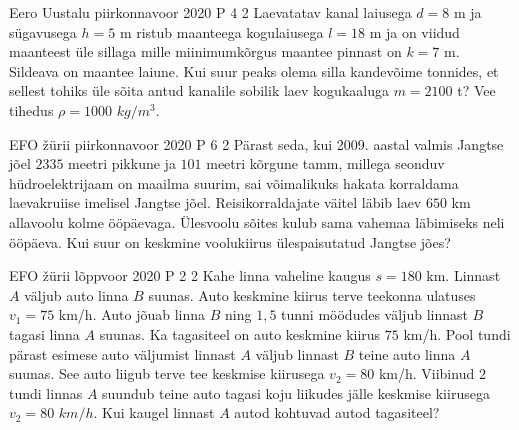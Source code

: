 \documentclass[11pt]{article}
\begin{document}
{%
{Eero Uustalu} %
{piirkonnavoor} %
{2020} %
{P 4} %
{2} %
{
\ifStatement
Laevatatav kanal laiusega $d = 8$ m ja sügavusega $h = 5$ m ristub maanteega kogulaiusega $l = 18$ m ja on viidud maanteest üle sillaga mille miinimumkõrgus maantee pinnast on $k = 7$ m. Sildeava on maantee laiune. Kui suur peaks olema silla kandevõime tonnides, et sellest tohiks üle sõita antud kanalile sobilik laev kogukaaluga $m = 2100$ t? Vee tihedus $\rho = 1000$ $kg/m^3$.
\fi
}

{EFO žürii} %
{piirkonnavoor} %
{2020} %
{P 6} %
{2} %
{
\ifStatement
Pärast seda, kui 2009. aastal valmis Jangtse jõel $2335$ meetri pikkune ja $101$ meetri kõrgune tamm, millega seonduv hüdroelektrijaam on maailma suurim, sai võimalikuks hakata korraldama laevakruiise imelisel Jangtse jõel. Reisikorraldajate väitel läbib laev $650$ km allavoolu kolme ööpäevaga. Ülesvoolu sõites kulub sama vahemaa läbimiseks neli ööpäeva. Kui suur on keskmine voolukiirus ülespaisutatud Jangtse jões?
\fi
}

{EFO žürii} %
{lõppvoor} %
{2020} %
{P 2} %
{2} %
{
\ifStatement
Kahe linna vaheline kaugus $s = 180$ km. Linnast $A$ väljub auto linna $B$ suunas. Auto keskmine kiirus terve teekonna ulatuses $v_1 = 75$ km/h. Auto jõuab linna $B$ ning $1,5$ tunni möödudes väljub linnast $B$ tagasi linna $A$ suunas. Ka tagasiteel on auto keskmine kiirus $75$ km/h. Pool tundi pärast esimese auto väljumist linnast $A$ väljub linnast $B$ teine auto linna $A$ suunas. See auto liigub terve tee keskmise kiirusega $v_2 = 80$ km/h. Viibinud $2$ tundi linnas $A$ suundub teine auto tagasi koju liikudes jälle keskmise kiirusega $v_2 = 80$ $km/h$. Kui kaugel linnast $A$ autod kohtuvad autod tagasiteel? 
\fi
}


}
\end{document}
